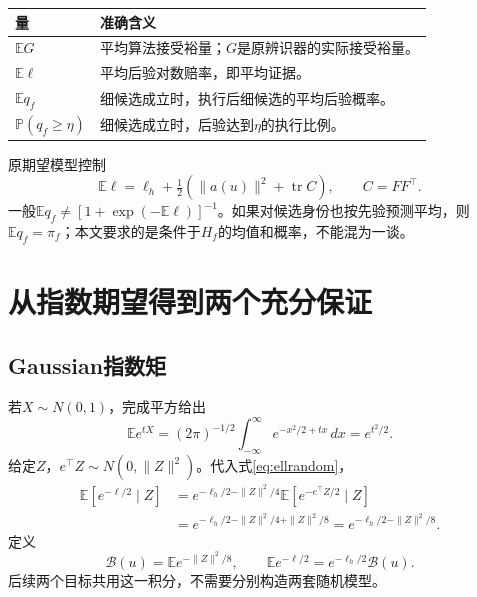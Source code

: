 \documentclass[UTF8,11pt,a4paper,fontset=fandol]{ctexart}
\newcommand{\E}{\mathbb E}
\newcommand{\Prob}{\mathbb P}
\newcommand{\tr}{\operatorname{tr}}
\numberwithin{equation}{section}
\begin{document}
\begin{center}\small
\begin{tabularx}{\linewidth}{lX}\toprule
量&准确含义\\\midrule
$\E G$&平均算法接受裕量；$G$是原辨识器的实际接受裕量。\\
$\E\ell$&平均后验对数赔率，即平均证据。\\
$\E q_f$&细候选成立时，执行后细候选的平均后验概率。\\
$\Prob(q_f\ge\eta)$&细候选成立时，后验达到$\eta$的执行比例。\\\bottomrule
\end{tabularx}
\end{center}
原期望模型控制
\begin{equation}
\E\ell=\ell_h+\tfrac12(\|a(u)\|^2+\tr C),\qquad C=FF^\top.
\end{equation}
一般$\E q_f\ne[1+\exp(-\E\ell)]^{-1}$。如果对候选身份也按先验预测平均，则$\E q_f=\pi_f$；本文要求的是条件于$H_f$的均值和概率，不能混为一谈。

\section{从指数期望得到两个充分保证}
\label{sec:bounds}
\subsection{Gaussian指数矩}
若$X\sim N(0,1)$，完成平方给出
\begin{equation}
\E e^{tX}=(2\pi)^{-1/2}\int_{-\infty}^{\infty}e^{-x^2/2+tx}\,dx=e^{t^2/2}.
\end{equation}
给定$Z$，$e^\top Z\sim N(0,\|Z\|^2)$。代入式\eqref{eq:ellrandom}，
\begin{align}
\E[e^{-\ell/2}\mid Z]
&=e^{-\ell_h/2-\|Z\|^2/4}\E[e^{-e^\top Z/2}\mid Z]\\
&=e^{-\ell_h/2-\|Z\|^2/4+\|Z\|^2/8}
=e^{-\ell_h/2-\|Z\|^2/8}.
\end{align}
定义
\begin{equation}
\mathcal B(u)=\E e^{-\|Z\|^2/8},
\qquad
\boxed{\E e^{-\ell/2}=e^{-\ell_h/2}\mathcal B(u).}
\label{eq:expidentity}
\end{equation}
后续两个目标共用这一积分，不需要分别构造两套随机模型。
\end{document}
